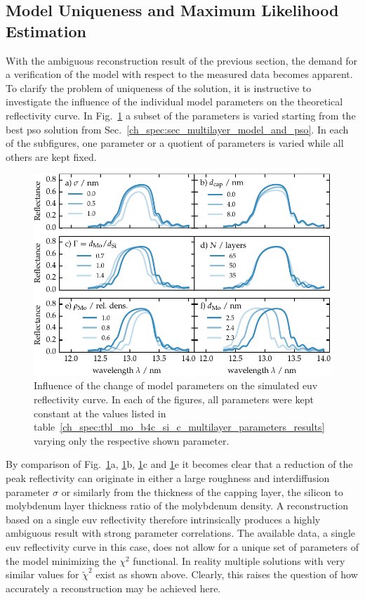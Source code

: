 \subsection{Model Uniqueness and Maximum Likelihood Estimation}  \label{ch_spec:sec_maximum_likelihood}
With the ambiguous reconstruction result of the previous section, the demand for a verification of the model with respect to the measured data becomes apparent. To clarify the problem of uniqueness of the solution, it is instructive to investigate the influence of the individual model parameters on the theoretical reflectivity curve. In Fig.~\ref{ch_spec:fig_mo_si_parameter_influence} a subset of the parameters is varied starting from the best \gls{pso} solution from Sec.~\ref{ch_spec:sec_multilayer_model_and_pso}. In each of the subfigures, one parameter or a quotient of parameters is varied while all others are kept fixed.
\begin{figure}[htbp]
\centering
\includegraphics{img/parameter_influence}
\caption[Influence of the change of model parameters on the simulated EUV reflectivity curve.]{Influence of the change of model parameters on the simulated \gls{euv} reflectivity curve. In each of the figures, all parameters were kept constant at the values listed in table~\ref{ch_spec:tbl_mo_b4c_si_c_multilayer_parameters_results} varying only the respective shown parameter.}
\label{ch_spec:fig_mo_si_parameter_influence}
\end{figure}
By comparison of Fig.~\ref{ch_spec:fig_mo_si_parameter_influence}a, \ref{ch_spec:fig_mo_si_parameter_influence}b, \ref{ch_spec:fig_mo_si_parameter_influence}c and \ref{ch_spec:fig_mo_si_parameter_influence}e it becomes clear that a reduction of the peak reflectivity can originate in either a large roughness and interdiffusion parameter $\sigma$ or similarly from the thickness of the capping layer, the silicon to molybdenum layer thickness ratio of the molybdenum density. A reconstruction based on a single \gls{euv} reflectivity therefore intrinsically produces a highly ambiguous result with strong parameter correlations. The available data, a single \gls{euv} reflectivity curve in this case, does not allow for a unique set of parameters of the model minimizing the $\chi^2$ functional. In reality multiple solutions with very similar values for $\tilde{\chi}^2$ exist as shown above. Clearly, this raises the question of how accurately a reconstruction may be achieved here.

